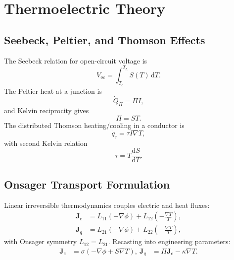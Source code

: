 \chapter{Thermoelectric Theory}\label{ch:te_theory}

\section{Seebeck, Peltier, and Thomson Effects}
The Seebeck relation for open-circuit voltage is
\begin{equation}\label{eq:seebeck}
V_{oc}=\int_{T_c}^{T_h} S(T)\,\mathrm{d}T.
\end{equation}
The Peltier heat at a junction is
\begin{equation}\label{eq:peltier}
\dot{Q}_{\Pi}=\Pi I,
\end{equation}
and Kelvin reciprocity gives
\begin{equation}\label{eq:kelvin1}
\Pi = ST.
\end{equation}
The distributed Thomson heating/cooling in a conductor is
\begin{equation}\label{eq:thomson}
\dot{q}_{\tau}=\tau I \nabla T,
\end{equation}
with second Kelvin relation
\begin{equation}\label{eq:kelvin2}
\tau=T\frac{\mathrm{d}S}{\mathrm{d}T}.
\end{equation}

\section{Onsager Transport Formulation}
Linear irreversible thermodynamics couples electric and heat fluxes:
\begin{align}
\mathbf{J}_e &= L_{11}\left(-\nabla\phi\right)+L_{12}\left(-\frac{\nabla T}{T}\right), \label{eq:onsager1}\\
\mathbf{J}_q &= L_{21}\left(-\nabla\phi\right)+L_{22}\left(-\frac{\nabla T}{T}\right), \label{eq:onsager2}
\end{align}
with Onsager symmetry $L_{12}=L_{21}$. Recasting into engineering parameters:
\begin{align}
\mathbf{J}_e &= \sigma\left(-\nabla\phi+S\nabla T\right), \label{eq:je}\
\mathbf{J}_q &= \Pi\mathbf{J}_e-\kappa\nabla T. \label{eq:jq}
\end{align}

